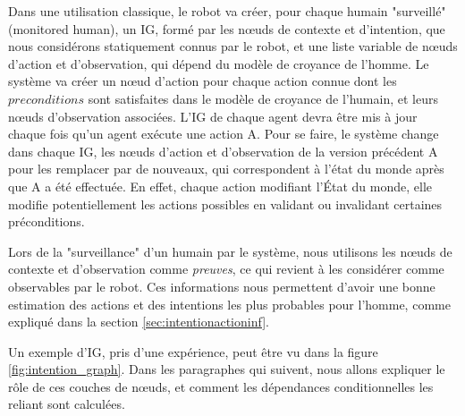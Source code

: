 \documentclass[a4paper,11pt,twoside]{StyleThese}
\begin{document}
Dans une utilisation classique, le robot va créer, pour chaque humain "surveillé" (monitored human), un IG, formé par les nœuds de contexte et d'intention, que nous considérons statiquement connus par le robot, et une liste variable de nœuds d'action et d'observation, qui dépend du modèle de croyance de l'homme. Le système va créer un nœud d'action pour chaque action connue dont les  $preconditions$ sont satisfaites dans le modèle de croyance de l'humain, et leurs nœuds d'observation associées. L'IG de chaque agent devra être mis à jour chaque fois qu'un agent exécute une action A. Pour se faire, le système change dans chaque IG, les nœuds d'action et d'observation de la version précédent A pour les remplacer par de nouveaux, qui correspondent à l'état du monde après que A a été effectuée. En effet, chaque action modifiant l'État du monde, elle modifie potentiellement les actions possibles en validant ou invalidant certaines préconditions.


Lors de la "surveillance" d'un humain par le système, nous utilisons les nœuds de contexte et d'observation comme \textit{preuves}, ce qui revient à les considérer comme observables par le robot. Ces informations nous permettent d'avoir une bonne estimation des actions et des intentions les plus probables pour l'homme, comme expliqué dans la section \ref{sec:intentionactioninf}.

Un exemple d'IG, pris d'une expérience, peut être vu dans la figure \ref{fig:intention_graph}. Dans les paragraphes qui suivent, nous allons expliquer le rôle de ces couches de nœuds, et comment les dépendances conditionnelles les reliant sont calculées.

\end{document}
